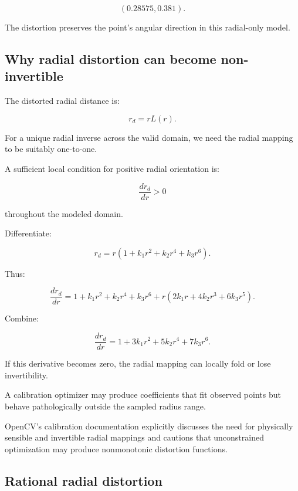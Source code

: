 \[
 \boxed{(0.28575,0.381)}.
\]

The distortion preserves the point's angular direction in this radial-only model.

\subsection{Why radial distortion can become non-invertible}\label{02-foundations-ii-ch035-why-radial-distortion-can-become-non-invertible}

\hypertarget{02-foundations-ii-ch035-why-radial-distortion-can-become-non-invertible}{}

The distorted radial distance is:

\[
 \boxed{ r_d=rL(r) }.
\]

For a unique radial inverse across the valid domain, we need the radial mapping to be suitably one-to-one.

A sufficient local condition for positive radial orientation is:

\[
 \boxed{ \frac{dr_d}{dr}>0 }
\]

throughout the modeled domain.

Differentiate:

\[
 r_d=r(1+k_1r^2+k_2r^4+k_3r^6).
\]

Thus:

\[
 \frac{dr_d}{dr} = 1+k_1r^2+k_2r^4+k_3r^6 +r(2k_1r+4k_2r^3+6k_3r^5).
\]

Combine:

\[
 \boxed{ \frac{dr_d}{dr} = 1+3k_1r^2+5k_2r^4+7k_3r^6 }.
\]

If this derivative becomes zero, the radial mapping can locally fold or lose invertibility.

A calibration optimizer may produce coefficients that fit observed points but behave pathologically outside the sampled radius range.

OpenCV's calibration documentation explicitly discusses the need for physically sensible and invertible radial mappings and cautions that unconstrained optimization may produce nonmonotonic distortion functions. 

\subsection{Rational radial distortion}\label{02-foundations-ii-ch035-rational-radial-distortion}

\hypertarget{02-foundations-ii-ch035-rational-radial-distortion}{}


